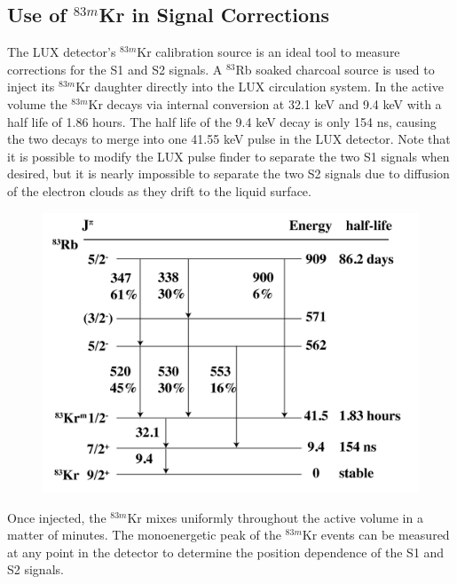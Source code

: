 \documentclass[a4paper,12pt]{article}
\begin{document}
{\subsection{Use of $^{83m}$Kr in Signal Corrections} \label{KrSource}

The LUX detector's $^{83m}$Kr calibration source is an ideal tool to measure corrections for the S1 and S2 signals. A $^{83}$Rb soaked charcoal source is used to inject its $^{83m}$Kr daughter directly into the LUX circulation system.  In the active volume the $^{83m}$Kr decays via internal conversion at 32.1 keV and 9.4 keV with a half life of 1.86 hours.  The half life of the 9.4 keV decay is only 154 ns, causing the two decays to merge into one 41.55 keV pulse in the LUX detector.  Note that it is possible to modify the LUX pulse finder to separate the two S1 signals when desired, but it is nearly impossible to separate the two S2 signals due to diffusion of the electron clouds as they drift to the liquid surface. 

\begin{figure} [!h]
\includegraphics[scale=.35]{Kr83Decay.png} 
\label{KrDecayScheme}
\end{figure}

Once injected, the $^{83m}$Kr mixes uniformly throughout the active volume in a matter of minutes. The monoenergetic peak of the $^{83m}$Kr events can be measured at any point in the detector to determine the position dependence of the S1 and S2 signals.

}
\end{document}

